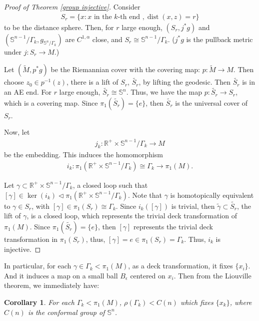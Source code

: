 \documentclass[12pt]{amsart}
\newtheorem{corollary}[theorem]{Corollary}
\theoremstyle{definition}
\begin{document}
\begin{proof}[Proof of Theorem \ref{group injective}]
    Consider 
    \begin{align*}
      S_r=\{x:x\text{ in the $k$-th end },\operatorname{dist}(x,z)=r\}  
    \end{align*}
    to be the distance sphere. Then, for $r$ large enough, $(S_r,j^*g)$ and $(\mathbb{S}^{n-1}/\Gamma_k,g_{\mathbb{S}^n/\Gamma_k})$ are $C^{1,\alpha}$ close, and $S_r\cong \mathbb{S}^{n-1}/\Gamma_k$. ($j^*g$ is the pullback metric under $j:S_r\to M$.)
  
  Let $(\tilde{M},p^*g)$ be the Riemannian cover with the covering map: $p:\tilde{M}\to M$. Then choose $z_0\in p^{-1}(z)$, there is a lift of $S_r$, $\tilde{S_r}$, by lifting the geodesic. Then $\tilde{S_r}$ is in an AE end. For $r$ large enough, $\tilde{S_r}\cong \mathbb{S}^n$. Thus, we have the map $p:\tilde{S_r}\to S_r$, which is a covering map. Since $\pi_1(\tilde{S_r})=\{e\}$, then $\tilde{S_r}$ is the universal cover of $S_r$.
  
  Now, let 
  \begin{align*}
      j_k:\mathbb{R}^+\times\mathbb{S}^{n-1}/\Gamma_k\to M
  \end{align*}
  be the embedding. This induces the homomorphism
  \begin{align*}
      i_k:\pi_1(\mathbb{R}^+\times\mathbb{S}^{n-1}/\Gamma_k)\cong \Gamma_k\to \pi_1(M).
  \end{align*}
  
  Let $\gamma\subset \mathbb{R}^+\times\mathbb{S}^{n-1}/\Gamma_k$, a closed loop such that $[\gamma]\in\operatorname{ker}(i_k)\lhd\pi_1(\mathbb{R}^+\times\mathbb{S}^{n-1}/\Gamma_k)$. Note that $\gamma$ is homotopically equivalent to $\gamma\in S_r$, with $[\gamma]\in \pi_1(S_r)\cong \Gamma_k$. Since $i_k([\gamma])$ is trivial, then $\tilde{\gamma}\subset \tilde{S_r}$, the lift of $\gamma$, is a closed loop, which represents the trivial deck transformation of $\pi_1(M)$. Since $\pi_1(\tilde{S_r})=\{e\}$, then $[\gamma]$ represents the trivial deck transformation in $\pi_1(S_r)$, thus, $[\gamma]=e\in\pi_1(S_r)=\Gamma_k$. Thus, $i_k$ is injective. 
\end{proof}
In particular, for each $\gamma\in\Gamma_k< \pi_1(M)$, as a deck transformation, it fixes $\{x_i\}$. And it induces a map on a small ball $B_\epsilon$ centered on $x_i$. Then from the Liouville theorem, we immediately have:

\begin{corollary}\label{cor 1}
  For each $\Gamma_k<\pi_1(M)$, $\rho(\Gamma_k)<C(n)$ which fixes $\{x_k\}$, where $C(n)$ is the conformal group of $\mathbb{S}^n$.
\end{corollary}
\end{document}
